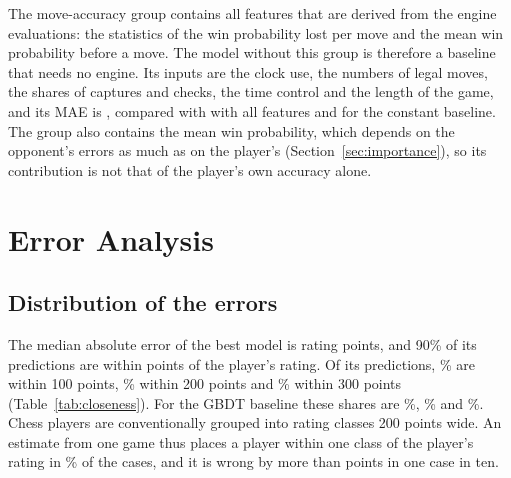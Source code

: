 \documentclass[11pt]{article}
\begin{document}
The move-accuracy group contains all features that are derived from the
engine evaluations: the statistics of the win probability lost per move and
the mean win probability before a move. The model without this group is
therefore a baseline that needs no engine. Its inputs are the clock use, the
numbers of legal moves, the shares of captures and checks, the time control
and the length of the game, and its MAE is
, compared with  with
all features and  for the constant baseline. The group also
contains the mean win probability, which depends on the opponent's errors as
much as on the player's (Section~\ref{sec:importance}), so its contribution
is not that of the player's own accuracy alone.
\fi
\fi

\section{Error Analysis}
\label{sec:error}



\iflook
\subsection{Distribution of the errors}

The median absolute error of the best model is  rating
points, and 90\% of its predictions are within  points of
the player's rating. Of its predictions, \% are
within 100 points, \% within 200 points and
\% within 300 points (Table~\ref{tab:closeness}).
For the GBDT baseline these shares are \%,
\% and \%. Chess
players are conventionally grouped into rating classes 200 points wide. An
estimate from one game thus places a player within one class of the player's
rating in \% of the cases, and it is wrong by more
than  points in one case in ten.

\begin{table}[htbp]\centering\small
{}
\caption{Distribution of the absolute errors on the test set: the median,
the 90th percentile, and the share of predictions within 100, 200 and 300
rating points of the player's rating.}
\label{tab:closeness}
\end{table}
\end{document}
